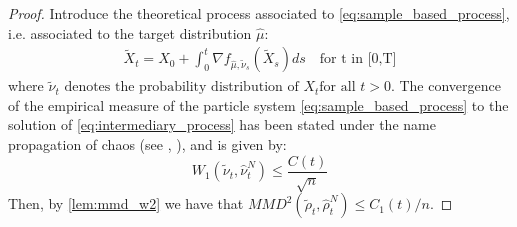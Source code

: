 \begin{proof} 
	Introduce the theoretical process associated to \eqref{eq:sample_based_process}, i.e. associated to the target distribution $\widehat{\mu}$:
	\begin{align}\label{eq:intermediary_process}
	\widetilde{X}_t=X_{0}+\int_{0}^t \nabla f_{\widehat{\mu}, \widetilde{\nu}_s}(\widetilde{X}_s)ds \quad \text{for t in [0,T]}
	\end{align}
	where $\widetilde{\nu}_t \text{ denotes the probability distribution of } X_t \text{for all } t>0$. The convergence of the empirical measure of the particle system \eqref{eq:sample_based_process} to the solution of \eqref{eq:intermediary_process} has been stated under the name propagation of chaos (see \cite{kac1956foundations}, \cite{sznitman1991topics}), and is given by:
	\begin{equation}
	W_1(\widetilde{\nu}_t,\widehat{\nu}_t^N)\le \frac{C(t)}{\sqrt{n}}
	\end{equation}
	Then, by \cref{lem:mmd_w2} we have that $MMD^2(\widetilde{\rho}_t,\widehat{\rho}_t^N)\le C_1(t)/n$.%
	

\end{proof}
